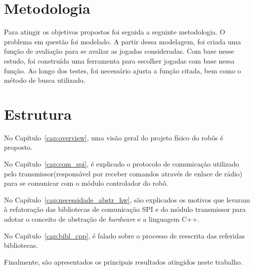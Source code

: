 \section{Metodologia}

Para atingir os objetivos propostos foi seguida a seguinte metodologia.
O problema em questão foi modelado. A partir dessa modelagem, foi
criada uma função de avaliação para se avaliar as jogadas consideradas.
Com base nesse estudo, foi construída uma ferramenta para escolher
jogadas com base nessa função. Ao longo dos testes, foi necessário
ajusta a função citada, bem como o método de busca utilizado.

\section{Estrutura}

%
%
%
%
%
%

No Capítulo~\ref{cap:overview}, uma visão geral do projeto físico do robôs é proposto.

No Capítulo~\ref{cap:com_spi}, é explicado o protocolo de comunicação utilizado pelo transmissor(responsável por receber comandos através de enlace de rádio) para se comunicar com o módulo controlador do robô.

No Capítulo~\ref{cap:necessidade_abstr_hw}, são explicados os motivos que levaram à refatoração das bibliotecas de comunicação SPI e do módulo transmissor para adotar o conceito de abstração de \textit{hardware} e a linguagem C++. 

No Capítulo~\ref{cap:bibl_cpp}, é falado sobre o processo de reescrita das referidas bibliotecas.

%


Finalmente, são apresentados os principais resultados atingidos neste trabalho.

